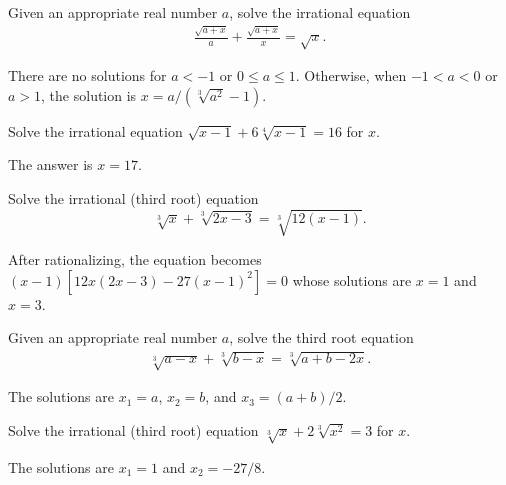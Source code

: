 \begin{question}\label{p:irrational-B}
    Given an appropriate real number $a$, solve the irrational equation
    \begin{align*}
        \frac{\sqrt{a+x}}{a}+\frac{\sqrt{a+x}}{x}=\sqrt x.
    \end{align*}
\end{question}

\begin{solution}
    There are no solutions for $a<-1$ or $0 \leq a \leq 1$. Otherwise, when $-1<a<0$ or $a>1$, the solution is $x=a/(\sqrt[3]{a^2}-1)$.
\end{solution}

\begin{question}\label{p:irrational-C}
    Solve the irrational equation $\sqrt{x-1}+6\sqrt[4]{x-1}=16$ for $x$.
\end{question}

\begin{solution}
    The answer is $x=17$.
\end{solution}

\begin{question}\label{p:irrational-D}
    Solve the irrational (third root) equation \[\sqrt[3]{x}+\sqrt[3]{2x-3}=\sqrt[3]{12(x-1)}.\]
\end{question}

\begin{solution}
    After rationalizing, the equation becomes $(x-1)[12x(2x-3)-27(x-1)^2]=0$ whose solutions are $x=1$ and $x=3$.
\end{solution}


\begin{question}\label{p:irrational-E}
    Given an appropriate real number $a$, solve the third root equation
    \begin{align*}
        \sqrt[3]{a-x}+\sqrt[3]{b-x}=\sqrt[3]{a+b-2x}.
    \end{align*}
\end{question}

\begin{solution}
    The solutions are $x_1=a$, $x_2=b$, and $x_3=(a+b)/2$.
\end{solution}


\begin{question}\label{p:irrational-F}
    Solve the irrational (third root) equation $\sqrt[3]{x}+2\sqrt[3]{x^2}=3$ for $x$.
\end{question}

\begin{solution}
    The solutions are $x_1=1$ and $x_2=-27/8$.
\end{solution}

